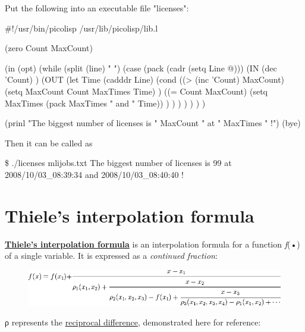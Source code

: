\begin{wideverbatim}

Put the following into an executable file "licenses":

#!/usr/bin/picolisp /usr/lib/picolisp/lib.l

(zero Count MaxCount)

(in (opt)
   (while (split (line) " ")
      (case (pack (cadr (setq Line @)))
         (IN
            (dec 'Count) )
         (OUT
            (let Time (cadddr Line)
               (cond
                  ((> (inc 'Count) MaxCount)
                     (setq MaxCount Count  MaxTimes Time) )
                  ((= Count MaxCount)
                     (setq MaxTimes (pack MaxTimes " and " Time)) ) ) ) ) ) ) )

(prinl "The biggest number of licenses is " MaxCount " at " MaxTimes " !")
(bye)

Then it can be called as

\$ ./licenses mlijobs.txt
The biggest number of licenses is 99 at 2008/10/03_08:39:34 and 2008/10/03_08:40:40 !

\end{wideverbatim}

\pagebreak{}
\section*{Thiele's interpolation formula}

\textbf{\href{http://en.wikipedia.org/wiki/Thiele\%27s\_interpolation\_formula}{Thiele's
interpolation formula}} is an interpolation formula for a function
\emph{f}(•) of a single variable. It is expressed as a
\emph{continued fraction}:

\begin{figure}[H]
\centering
\includegraphics[scale=.6]{graphics/64932f8d89d7f1750d3d40723007bd27.png}
\end{figure}

ρ represents the
\href{http://en.wikipedia.org/wiki/reciprocal\_difference}{reciprocal
difference}, demonstrated here for reference:

